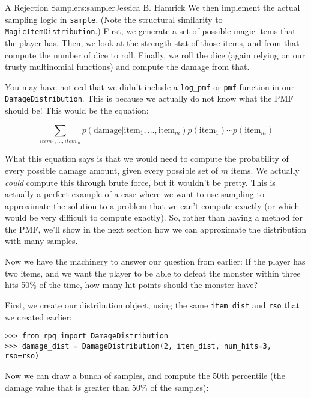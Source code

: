 \begin{aosachapter}{A Rejection Sampler}{s:sampler}{Jessica B. Hamrick}
We then implement the actual sampling logic in \texttt{sample}. (Note
the structural similarity to \texttt{MagicItemDistribution}.) First, we
generate a set of possible magic items that the player has. Then, we
look at the strength stat of those items, and from that compute the
number of dice to roll. Finally, we roll the dice (again relying on our
trusty multinomial functions) and compute the damage from that.

\label{what-happened-to-evaluating-probabilities}

You may have noticed that we didn't include a \texttt{log\_pmf} or
\texttt{pmf} function in our \texttt{DamageDistribution}. This is
because we actually do not know what the PMF should be! This would be
the equation:

\[
\sum_{{item}_1, \ldots{}, {item}_m} p(\mathrm{damage} \vert \mathrm{item}_1,\ldots{},\mathrm{item}_m)p(\mathrm{item}_1)\cdots{}p(\mathrm{item}_m)
\]

What this equation says is that we would need to compute the probability
of every possible damage amount, given every possible set of $m$ items.
We actually \emph{could} compute this through brute force, but it
wouldn't be pretty. This is actually a perfect example of a case where
we want to use sampling to approximate the solution to a problem that we
can't compute exactly (or which would be very difficult to compute
exactly). So, rather than having a method for the PMF, we'll show in the
next section how we can approximate the distribution with many samples.

\label{approximating-the-distribution}

Now we have the machinery to answer our question from earlier: If the
player has two items, and we want the player to be able to defeat the
monster within three hits 50\% of the time, how many hit points should
the monster have?

First, we create our distribution object, using the same
\texttt{item\_dist} and \texttt{rso} that we created earlier:

\begin{verbatim}
>>> from rpg import DamageDistribution
>>> damage_dist = DamageDistribution(2, item_dist, num_hits=3, rso=rso)
\end{verbatim}

Now we can draw a bunch of samples, and compute the 50th percentile (the
damage value that is greater than 50\% of the samples):


\end{aosachapter}

